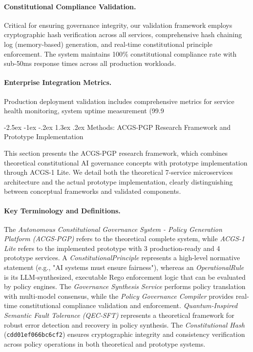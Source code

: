 \documentclass[manuscript,screen,9pt]{acmart}
\makeatletter
\renewcommand\section{\@startsection{section}{1}{\z@}%
  {-2.5ex \@plus -1ex \@minus -.2ex}%
  {1.3ex \@plus.2ex}%
  {\normalfont\Large\bfseries}}
\makeatother
\begin{document}
\paragraph{Constitutional Compliance Validation.} Critical for ensuring governance integrity, our validation framework employs cryptographic hash verification across all services, comprehensive hash chaining log (memory-based) generation, and real-time constitutional principle enforcement. The system maintains 100\% constitutional compliance rate with sub-50ms response times across all production workloads.

\paragraph{Enterprise Integration Metrics.} Production deployment validation includes comprehensive metrics for service health monitoring, system uptime measurement (99.9%

\section{Methods: ACGS-PGP Research Framework and Prototype Implementation}
\label{sec:methods}

This section presents the ACGS-PGP research framework, which combines theoretical constitutional AI governance concepts with prototype implementation through ACGS-1 Lite. We detail both the theoretical 7-service microservices architecture and the actual prototype implementation, clearly distinguishing between conceptual frameworks and validated components.

\paragraph{Key Terminology and Definitions.} The \textit{Autonomous Constitutional Governance System - Policy Generation Platform (ACGS-PGP)} refers to the theoretical complete system, while \textit{ACGS-1 Lite} refers to the implemented prototype with 3 production-ready and 4 prototype services. A \textit{ConstitutionalPrinciple} represents a high-level normative statement (e.g., "AI systems must ensure fairness"), whereas an \textit{OperationalRule} is its LLM-synthesized, executable Rego enforcement logic that can be evaluated by policy engines. The \textit{Governance Synthesis Service} performs policy translation with multi-model consensus, while the \textit{Policy Governance Compiler} provides real-time constitutional compliance validation and enforcement. \textit{Quantum-Inspired Semantic Fault Tolerance (QEC-SFT)} represents a theoretical framework for robust error detection and recovery in policy synthesis. The \textit{Constitutional Hash} (\texttt{cdd01ef066bc6cf2}) ensures cryptographic integrity and consistency verification across policy operations in both theoretical and prototype systems.
\end{document}
